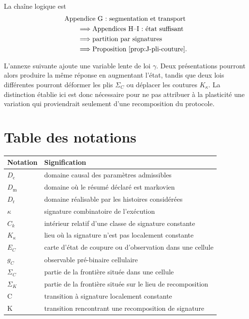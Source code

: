 La chaîne logique est
\[
\begin{aligned}
&\text{Appendice G : segmentation et transport}\\
&\qquad\Longrightarrow \text{Appendices H--I : état suffisant}\\
&\qquad\Longrightarrow \text{partition par signatures}\\
&\qquad\Longrightarrow \text{Proposition~\ref{prop:J-pli-couture}}.
\end{aligned}
\]

L'annexe suivante ajoute une variable lente de loi $\gamma$. Deux
présentations pourront alors produire la même réponse en augmentant
l'état, tandis que deux lois différentes pourront déformer les plis
$\Sigma_C$ ou déplacer les coutures $K_\kappa$. La distinction établie
ici est donc nécessaire pour ne pas attribuer à la plasticité une
variation qui proviendrait seulement d'une recomposition du protocole.

\section{Table des notations}
\label{annexe-J-notations}

\begin{center}
\begin{tabular}{p{}p{}}
\toprule
Notation & Signification \\
\midrule
$D_{\mathrm c}$ & domaine causal des paramètres admissibles \\
$D_{\mathrm m}$ & domaine où le résumé déclaré est markovien \\
$D_{\mathrm r}$ & domaine réalisable par les histoires considérées \\
$\kappa$ & signature combinatoire de l'exécution \\
$C_k$ & intérieur relatif d'une classe de signature constante \\
$K_\kappa$ & lieu où la signature n'est pas localement constante \\
$E_C$ & carte d'état de coupure ou d'observation dans une cellule \\
$g_C$ & observable pré-binaire cellulaire \\
$\Sigma_C$ & partie de la frontière située dans une cellule \\
$\Sigma_K$ & partie de la frontière située sur le lieu de recomposition \\
C & transition à signature localement constante \\
K & transition rencontrant une recomposition de signature \\
\bottomrule
\end{tabular}
\end{center}

